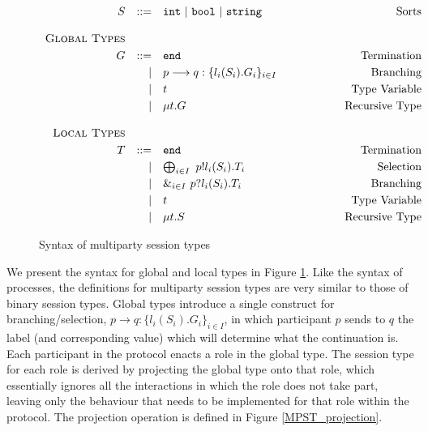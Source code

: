 \documentclass[12pt,twoside]{report}
\newcommand{\white}{\ \ \ \ \ \ \ \ \ \ \ \ }
\begin{document}
\begin{figure}[h]
    \centering
    \begin{equation*}
    \centering
    \begin{array}{rrlcr}
        S & ::= & \texttt{int}\ |\ \texttt{bool}\ |\ \texttt{string}& \white & \text{Sorts}\\\\
        \textsc{Global\ Types} & && &\\[3pt]
        G & ::= & \texttt{end} & \white & \text{Termination}  \\[2.75pt]
             & | & p \longrightarrow q: \{l_i( S_i).G_i\}_{i \in I} & \white & \text{Branching} \\[2.75pt] 
             & | & t & \white & \text{Type\ Variable} \\[2.75pt]
             & | & \mu t.G & \white & \text{Recursive\ Type}\\\\
             
        \textsc{Local Types} &&&& \\[3pt]
        T & ::= & \texttt{end} & \white & \text{Termination}  \\[2.75pt]
          & | & \bigoplus_{i \in I}\ p!l_i(S_i).T_i & \white& \text{Selection} \\[2.75pt]
          & | & \&_{i \in I}\ p?l_i(S_i).T_i & \white & \text{Branching} \\[2.75pt] 
          & | & t & \white & \text{Type\ Variable} \\[2.75pt]
          & | & \mu t.S & \white & \text{Recursive\ Type}
        
        \end{array}
    \end{equation*}
    \caption{Syntax of multiparty session types}
    \label{MPST_types}
\end{figure}{}

We present the syntax for global and local types in Figure \ref{MPST_types}. Like the syntax of processes, the definitions for multiparty session types are very similar to those of binary session types. Global types introduce a single construct for branching/selection, $p \longrightarrow q:\{l_i(S_i).G_i\}_{i \in I}$, in which participant $p$ sends to $q$ the label (and corresponding value) which will determine what the continuation is.\\

Each participant in the protocol enacts a role in the global type. The session type for each role is derived by projecting the global type onto that role, which essentially ignores all the interactions in which the role does not take part, leaving only the behaviour that needs to be implemented for that role within the protocol. The projection operation is defined in Figure \ref{MPST_projection}.\\
\end{document}
